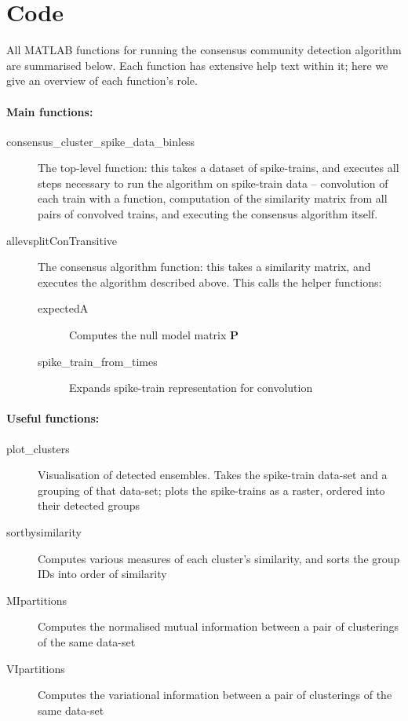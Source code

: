 \documentclass[11pt,a4paper]{article}
\begin{document}
\section{Code}
All MATLAB functions for running the consensus community detection algorithm are summarised below. Each function has extensive help text within it; here we give an overview of each function's role.

\paragraph{Main functions:}
\begin{description}
\item[consensus\_cluster\_spike\_data\_binless] The top-level function: this takes a dataset of spike-trains, and executes all steps necessary to run the algorithm on spike-train data -- convolution of each train with a function, computation of the similarity matrix from all pairs of convolved trains, and executing the consensus algorithm itself.
\item[allevsplitConTransitive] The consensus algorithm function: this takes a similarity matrix, and executes the algorithm described above. This calls the helper functions:
    \begin{description}
        \item[expectedA] Computes the null model matrix $\mathbf{P}$
        \item[spike\_train\_from\_times] Expands spike-train representation for convolution
    \end{description}
\end{description}

\paragraph{Useful functions:}
\begin{description}
\item[plot\_clusters] Visualisation of detected ensembles. Takes the spike-train data-set and a grouping of that data-set; plots the spike-trains as a raster, ordered into their detected groups
\item[sortbysimilarity] Computes various measures of each cluster's similarity, and sorts the group IDs into order of similarity
\item[MIpartitions] Computes the normalised mutual information between a pair of clusterings of the same data-set
\item[VIpartitions] Computes the variational information between a pair of clusterings of the same data-set
\end{description}
\end{document}
